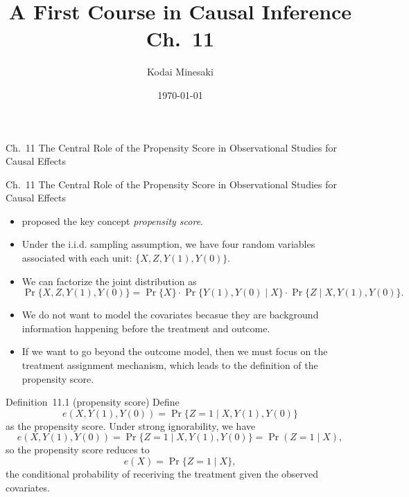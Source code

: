\documentclass[aspectratio=169, 12pt]{beamer}
\title[]{A First Course in Causal Inference Ch.~11}
\author[Kodai Minesaki]{Kodai Minesaki}
\institute[Faculty of Engineering, The University of Tokyo]{Faculty of Engineering, The University of Tokyo}
\date{\today}
\begin{document}
\begin{frame}
\titlepage
\end{frame}


\begin{frame}

  {
    \large
    Ch.~11 The Central Role of the Propensity Score in Observational Studies for Causal Effects
  }
  
\end{frame}

\begin{frame}{Ch.~11 The Central Role of the Propensity Score in Observational Studies for Causal Effects}
  \begin{itemize}
    \item \citet{rosenbaum1983central} proposed the key concept \textit{propensity score}.
    \item Under the i.i.d. sampling assumption, we have four random variables associated with each unit: $\{X,Z,Y(1),Y(0)\}$. 
    \item We can factorize the joint distribution as
    \[
    \Pr\{X,Z,Y(1),Y(0)\} = \Pr\{X\}\cdot\Pr\{Y(1),Y(0)\mid X\}\cdot\Pr\{Z\mid X,Y(1),Y(0)\}.
    \]
    \item We do not want to model the covariates becasue they are background information happening before the treatment and outcome. 
    \item If we want to go beyond the outcome model, then we must focus on the treatment assignment mechanism, which leads to the definition of the propensity score.
  \end{itemize}
\end{frame}

\begin{frame}
  \begin{center}
    \begin{keybox}{Definition~11.1 (propensity score)}
     Define 
     \[
     e(X,Y(1),Y(0))=\Pr\{Z=1\mid X,Y(1),Y(0)\}
     \] 
     as the propensity score. Under strong ignorability, we have 
     \[
     e(X,Y(1),Y(0))=\Pr\{Z=1\mid X,Y(1),Y(0)\} = \Pr(Z=1\mid X),
     \] 
     so the propensity score reduces to 
     \[
     e(X)=\Pr\{Z=1\mid X\},
     \]
     the conditional probability of receriving the treatment given the observed covariates.
  \end{keybox}
  \end{center}
\end{frame}
\end{document}
